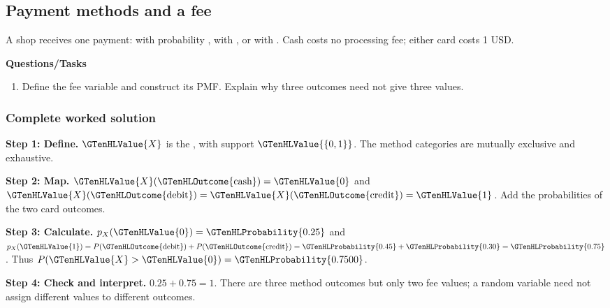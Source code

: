 \subsection{Payment methods and a fee}
A shop receives one payment:  with probability ,  with , or  with . Cash costs no processing fee; either card costs 1 USD.

\textbf{Questions/Tasks}
\begin{enumerate}
\item Define the fee variable and construct its PMF. Explain why three outcomes need not give three values.
\end{enumerate}
\subsubsection*{Complete worked solution}
\par\noindent\begin{minipage}{\linewidth}
\textbf{Step 1: Define.} $\GTenHLValue{X}$ is the , with support $\GTenHLValue{\{0,1\}}$. The method categories are mutually exclusive and exhaustive.
\end{minipage}\par\medskip
\par\noindent\begin{minipage}{\linewidth}
\textbf{Step 2: Map.} $\GTenHLValue{X}(\GTenHLOutcome{\text{cash}})=\GTenHLValue{0}$ and $\GTenHLValue{X}(\GTenHLOutcome{\text{debit}})=\GTenHLValue{X}(\GTenHLOutcome{\text{credit}})=\GTenHLValue{1}$. Add the probabilities of the two card outcomes.
\end{minipage}\par\medskip
\par\noindent\begin{minipage}{\linewidth}
\textbf{Step 3: Calculate.} $p_X(\GTenHLValue{0})=\GTenHLProbability{0.25}$ and $p_X(\GTenHLValue{1})=P(\GTenHLOutcome{\text{debit}})+P(\GTenHLOutcome{\text{credit}})=\GTenHLProbability{0.45}+\GTenHLProbability{0.30}=\GTenHLProbability{0.75}$. Thus $P(\GTenHLValue{X}>\GTenHLValue{0})=\GTenHLProbability{0.7500}$.
\end{minipage}\par\medskip
\par\noindent\begin{minipage}{\linewidth}
\textbf{Step 4: Check and interpret.} $0.25+0.75=1$. There are three method outcomes but only two fee values; a random variable need not assign different values to different outcomes.
\end{minipage}\par\medskip
